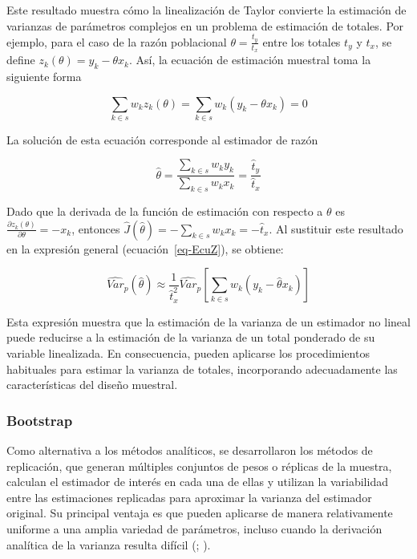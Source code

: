 \documentclass[
  spanish,
  11pt,
  letterpaper,
  oneside,
  open=any]{scrbook}
\begin{document}
Este resultado muestra cómo la linealización de Taylor convierte la
estimación de varianzas de parámetros complejos en un problema de
estimación de totales. Por ejemplo, para el caso de la razón poblacional
\(\theta=\frac{t_y}{t_x}\) entre los totales \(t_y\) y \(t_x\), se
define \(z_k(\theta)=y_k-\theta x_k\). Así, la ecuación de estimación
muestral toma la siguiente forma

\[
\sum_{k \in s} w_k z_k(\theta) = \sum_{k \in s} w_k \left(y_k - \theta x_k\right) = 0
\]

La solución de esta ecuación corresponde al estimador de razón

\[
\hat{\theta} = \frac{\sum_{k \in s} w_k y_k}{\sum_{k \in s} w_k x_k} = \frac{\hat t_y}{\hat t_x}
\]

Dado que la derivada de la función de estimación con respecto a
\(\theta\) es \(\frac{\partial z_k(\theta)}{\partial \theta} = -x_k\),
entonces
\(\hat{J}(\hat{\theta}) = -\sum_{k \in s} w_k x_k = -\hat{t}_x\). Al
sustituir este resultado en la expresión general
(ecuación~\ref{eq-EcuZ}), se obtiene:

\[
\widehat{Var}_p(\hat{\theta})
\approx
\frac{1}{\hat{t}_x^2}
\widehat{Var}_p
\left[
\sum_{k \in s}
w_k
\left(y_k-\hat{\theta}x_k\right)
\right]
\]

Esta expresión muestra que la estimación de la varianza de un estimador
no lineal puede reducirse a la estimación de la varianza de un total
ponderado de su variable linealizada. En consecuencia, pueden aplicarse
los procedimientos habituales para estimar la varianza de totales,
incorporando adecuadamente las características del diseño muestral.

\subsubsection{Bootstrap}\label{bootstrap}

Como alternativa a los métodos analíticos, se desarrollaron los métodos
de replicación, que generan múltiples conjuntos de pesos o réplicas de
la muestra, calculan el estimador de interés en cada una de ellas y
utilizan la variabilidad entre las estimaciones replicadas para
aproximar la varianza del estimador original. Su principal ventaja es
que pueden aplicarse de manera relativamente uniforme a una amplia
variedad de parámetros, incluso cuando la derivación analítica de la
varianza resulta difícil (;
).
\end{document}
